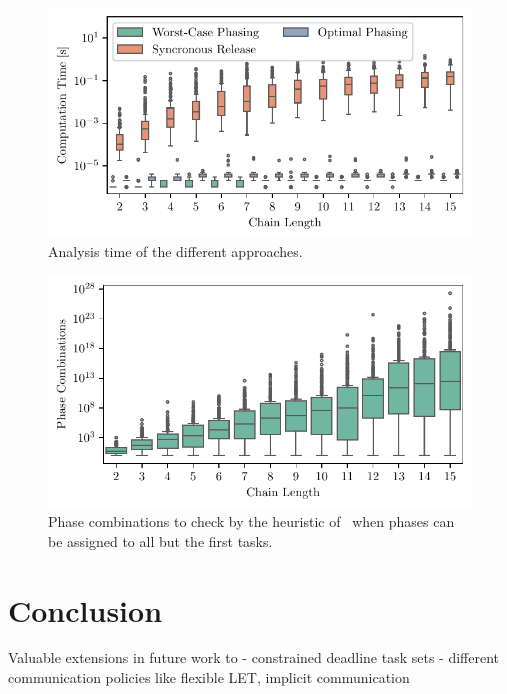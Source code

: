 \documentclass[10pt,conference]{resources/IEEEtran}
\theoremstyle{definition}
\begin{document}
\begin{figure}
	\includegraphics[width=\columnwidth]{plots/AnalysisTimeComp.pdf}
	\caption{Analysis time of the different approaches.}
	\label{fig:analysisTime}
\end{figure}

\begin{figure}
	\includegraphics[width=\columnwidth]{plots/HeuristicCombinations.pdf}
	\caption{Phase combinations to check by the heuristic of~\cite{Martinez:LET2018} when phases can be assigned to all but the first tasks.}
	\label{fig:heuristicComp}
\end{figure}

\section{Conclusion}
\label{sec:conclusion}


Valuable extensions in future work to 
- constrained deadline task sets
- different communication policies like flexible LET, implicit communication
\end{document}
